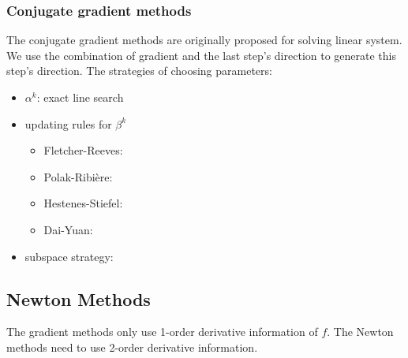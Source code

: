 	\subsubsection{Conjugate gradient methods}
	The conjugate gradient methods are  originally proposed for solving linear system. We use the combination of gradient and the last step's direction to generate this step's direction.
	The strategies of choosing parameters:
	\begin{itemize}
		
		\item $\alpha^k$: exact line search
		\item updating rules for $\beta^k$
		\begin{itemize}
			\item Fletcher-Reeves: \\[1mm]
			\item Polak-Ribi\`{e}re: \\[1mm]
			\item Hestenes-Stiefel: \\[1mm]
			\item Dai-Yuan: 
		\end{itemize}
		\item subspace strategy:
	
		\vspace{-2mm}
	\end{itemize}


\subsection{Newton Methods}
	The gradient methods only use 1-order derivative information of $f$. The Newton methods need to use 2-order derivative information.
